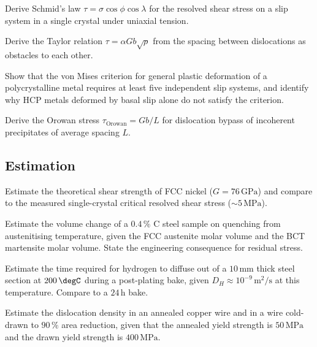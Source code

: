 \begin{exercise}
Derive Schmid's law $\tau = \sigma \cos\phi \cos\lambda$ for the
resolved shear stress on a slip system in a single crystal under
uniaxial tension.
\end{exercise}

\begin{exercise}
Derive the Taylor relation $\tau = \alpha G b \sqrt{\rho}$ from the
spacing between dislocations as obstacles to each other.
\end{exercise}

\begin{exercise}
Show that the von Mises criterion for general plastic deformation of
a polycrystalline metal requires at least five independent slip
systems, and identify why HCP metals deformed by basal slip alone do
not satisfy the criterion.
\end{exercise}

\begin{exercise}
Derive the Orowan stress $\tau_{\text{Orowan}} = G b/L$ for
dislocation bypass of incoherent precipitates of average spacing $L$.
\end{exercise}

\subsection*{Estimation}

\begin{exercise}
Estimate the theoretical shear strength of FCC nickel ($G = 76\,
\text{GPa}$) and compare to the measured single-crystal critical
resolved shear stress ($\sim 5\,\text{MPa}$).
\end{exercise}

\begin{exercise}
Estimate the volume change of a $0.4\,\%$ C steel sample on quenching
from austenitising temperature, given the FCC austenite molar volume
and the BCT martensite molar volume. State the engineering consequence
for residual stress.
\end{exercise}

\begin{exercise}
Estimate the time required for hydrogen to diffuse out of a $10\,
\text{mm}$ thick steel section at $200\,\degC$ during a post-plating
bake, given $D_H \approx 10^{-9}\,\text{m}^2/\si{\second}$ at this
temperature. Compare to a $24\,\text{h}$ bake.
\end{exercise}

\begin{exercise}
Estimate the dislocation density in an annealed copper wire and in
a wire cold-drawn to $90\,\%$ area reduction, given that the
annealed yield strength is $50\,\text{MPa}$ and the drawn yield
strength is $400\,\text{MPa}$.
\end{exercise}

